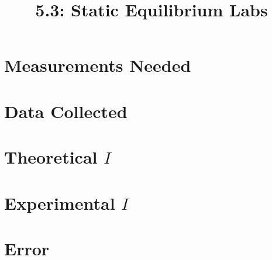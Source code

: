 \documentclass{article}
\title{5.3: Static Equilibrium Labs}
\begin{document}
\section{Measurements Needed}
\section{Data Collected}
\section{Theoretical $I$}
\section{Experimental $I$}
\section{Error}
\end{document}
